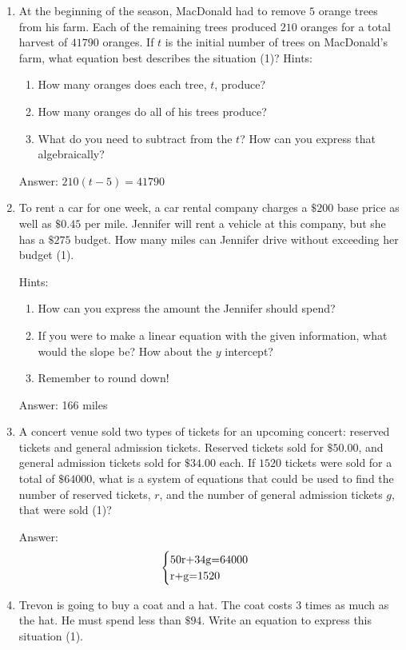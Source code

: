 \documentclass{article}
\begin{document}
\begin{enumerate}
{	      Answer: 60
	      }
	\item {
	      At the beginning of the season, MacDonald had to remove $5$ orange trees from his farm. Each of the remaining trees produced $210$ oranges for a total harvest of $41790$ oranges. If $t$ is the initial number of trees on MacDonald's farm, what equation best describes the situation (1)?
	      Hints:
	      \begin{enumerate}
		      \item {How many oranges does each tree, $t$, produce?}
		      \item {How many oranges do all of his trees produce?}
		      \item{What do you need to subtract from the $t$? How can you express that algebraically?}
	      \end{enumerate}

	      Answer: $210(t-5)=41790$
	      }
	\item {
	      To rent a car for one week, a car rental company charges a $\$200$ base price as well as $\$0.45$ per mile. Jennifer will rent a vehicle at this company, but she has a $\$275$ budget. How many miles can Jennifer drive without exceeding her budget (1).

	      Hints:
	      \begin{enumerate}
		      \item{How can you express the amount the Jennifer should spend?}
		      \item{If you were to make a linear equation with the given information, what would the slope be? How about the $y$ intercept?}
		      \item{Remember to round down!}
	      \end{enumerate}

	      Answer: 166 miles
	      }
	\item {
	      A concert venue sold two types of tickets for an upcoming concert: reserved tickets and general admission tickets. Reserved tickets sold for $\$50.00$, and general admission tickets sold for $\$34.00$ each. If $1520$ tickets were sold for a total of $\$64000$, what is a system of equations that could be used to find the number of reserved tickets, $r$, and the number of general admission tickets $g$, that were sold (1)?

	      Answer:
	      \[
		      \begin{array}{l}
			      \begin{cases}
				      $50r+34g=64000$ & \\
				      $r+g=1520$
			      \end{cases}
		      \end{array}\]
	      }
	\item {Trevon is going to buy a coat and a hat. The coat costs $3$ times as much as the hat. He must spend less than $\$94$. Write an equation to express this situation (1).

}
\end{enumerate}
\end{document}
